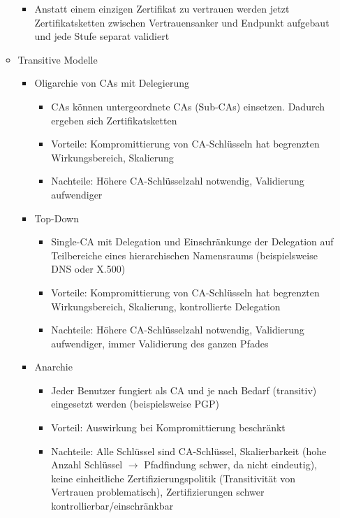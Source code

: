 \begin{itemize}
\begin{itemize}
\begin{itemize}
			\item Anstatt einem einzigen Zertifikat zu vertrauen werden jetzt Zertifikatsketten zwischen Vertrauensanker und Endpunkt aufgebaut und jede Stufe separat validiert
		\end{itemize}
		\item Transitive Modelle
		\begin{itemize}
			\item Oligarchie von CAs mit Delegierung
			\begin{itemize}
				\item CAs können untergeordnete CAs (Sub-CAs) einsetzen. Dadurch ergeben sich Zertifikatsketten
				\item Vorteile: Kompromittierung von CA-Schlüsseln hat begrenzten Wirkungsbereich, Skalierung
				\item Nachteile: Höhere CA-Schlüsselzahl notwendig, Validierung aufwendiger
			\end{itemize}
			\item Top-Down
			\begin{itemize}
				\item Single-CA mit Delegation und Einschränkunge der Delegation auf Teilbereiche eines hierarchischen Namensraums (beispielsweise DNS oder X.500)
				\item Vorteile: Kompromittierung von CA-Schlüsseln hat begrenzten Wirkungsbereich, Skalierung, kontrollierte Delegation
				\item Nachteile: Höhere CA-Schlüsselzahl notwendig, Validierung aufwendiger, immer Validierung des ganzen Pfades
			\end{itemize}
			\item Anarchie
			\begin{itemize}
				\item Jeder Benutzer fungiert als CA und je nach Bedarf (transitiv) eingesetzt werden (beispielsweise PGP)
				\item Vorteil: Auswirkung bei Kompromittierung beschränkt
				\item Nachteile: Alle Schlüssel sind CA-Schlüssel, Skalierbarkeit (hohe Anzahl Schlüssel \(\rightarrow\) Pfadfindung schwer, da nicht eindeutig), keine einheitliche Zertifizierungspolitik (Transitivität von Vertrauen problematisch), Zertifizierungen schwer kontrollierbar/einschränkbar
			\end{itemize}
		\end{itemize}
	\end{itemize}
\end{itemize}


